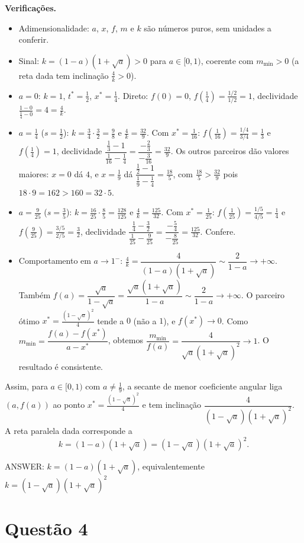 \documentclass{article}%
\begin{document}
\textbf{Verificações.}
\begin{itemize}
\item Adimensionalidade: $a$, $x$, $f$, $m$ e $k$ são números puros, sem unidades a conferir.
\item Sinal: $k=(1-a)(1+\sqrt{a})>0$ para $a\in[0,1)$, coerente com $m_{\min}>0$ (a reta dada tem inclinação $\frac{4}{k}>0$).
\item $a=0$: $k=1$, $t^*=\frac12$, $x^*=\frac14$. Direto: $f(0)=0$, $f\left(\frac14\right)=\frac{1/2}{1/2}=1$, declividade $\frac{1-0}{\frac14-0}=4=\frac{4}{k}$.
\item $a=\frac14$ ($s=\frac12$): $k=\frac34\cdot\frac32=\frac98$ e $\frac4k=\frac{32}{9}$. Com $x^*=\frac{1}{16}$: $f\left(\frac{1}{16}\right)=\frac{1/4}{3/4}=\frac13$ e $f\left(\frac14\right)=1$, declividade $\dfrac{\frac13-1}{\frac{1}{16}-\frac14}=\dfrac{-\frac23}{-\frac{3}{16}}=\frac{32}{9}$. Os outros parceiros dão valores maiores: $x=0$ dá $4$, e $x=\frac19$ dá $\dfrac{\frac12-1}{\frac19-\frac14}=\frac{18}{5}$, com $\frac{18}{5}>\frac{32}{9}$ pois $18\cdot 9=162>160=32\cdot 5$.
\item $a=\frac{9}{25}$ ($s=\frac35$): $k=\frac{16}{25}\cdot\frac{8}{5}=\frac{128}{125}$ e $\frac4k=\frac{125}{32}$. Com $x^*=\frac{1}{25}$: $f\left(\frac{1}{25}\right)=\frac{1/5}{4/5}=\frac14$ e $f\left(\frac{9}{25}\right)=\frac{3/5}{2/5}=\frac32$, declividade $\dfrac{\frac14-\frac32}{\frac{1}{25}-\frac{9}{25}}=\dfrac{-\frac54}{-\frac{8}{25}}=\frac{125}{32}$. Confere.
\item Comportamento em $a\to1^-$: $\frac4k=\dfrac{4}{(1-a)(1+\sqrt a)}\sim\dfrac{2}{1-a}\to+\infty$. Também $f(a)=\dfrac{\sqrt a}{1-\sqrt a}=\dfrac{\sqrt a(1+\sqrt a)}{1-a}\sim\dfrac{2}{1-a}\to+\infty$. O parceiro ótimo $x^*=\frac{(1-\sqrt a)^2}{4}$ tende a $0$ (não a $1$), e $f(x^*)\to0$. Como $m_{\min}=\dfrac{f(a)-f(x^*)}{a-x^*}$, obtemos $\dfrac{m_{\min}}{f(a)}=\dfrac{4}{\sqrt a(1+\sqrt a)^2}\to1$. O resultado é consistente.
\end{itemize}

Assim, para $a\in[0,1)$ com $a\neq\frac19$, a secante de menor coeficiente angular liga $(a,f(a))$ ao ponto $x^*=\frac{(1-\sqrt a)^2}{4}$ e tem inclinação $\dfrac{4}{(1-\sqrt a)(1+\sqrt a)^2}$. A reta paralela dada corresponde a
\[
k=(1-a)(1+\sqrt{a})=(1-\sqrt{a})(1+\sqrt{a})^2.
\]

ANSWER: $k=(1-a)(1+\sqrt{a})$, equivalentemente $k=(1-\sqrt{a})(1+\sqrt{a})^2$%
\newpage%
\section*{Questão 4}
\end{document}
